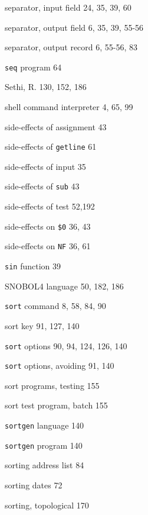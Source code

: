 \begin{multicols}{3}
\hangindent=3pc  separator, input field 24, 35, 39, 60

\hangindent=3pc  separator, output field 6, 35, 39, 55-56

\hangindent=3pc  separator, output record 6, 55-56,  83

\hangindent=3pc  \verb'seq' program 64

\hangindent=3pc  Sethi, R. 130, 152, 186

\hangindent=3pc  shell command interpreter 4, 65, 99

\hangindent=3pc  side-effects of assignment 43

\hangindent=3pc  side-effects of \verb'getline' 61

\hangindent=3pc  side-effects of input 35

\hangindent=3pc  side-effects of \verb'sub' 43

\hangindent=3pc  side-effects of test 52,192

\hangindent=3pc  side-effects on \verb'$0' 36, 43

\hangindent=3pc  side-effects on \verb'NF' 36, 61

\hangindent=3pc  \verb'sin' function 39

\hangindent=3pc  SNOBOL4 language 50, 182, 186

\hangindent=3pc  \verb'sort' command 8, 58, 84, 90

\hangindent=3pc  sort key 91, 127, 140

\hangindent=3pc  \verb'sort' options 90, 94, 124, 126, 140

\hangindent=3pc  \verb'sort' options, avoiding 91, 140


\hangindent=3pc  sort programs, testing 155

\hangindent=3pc  sort test program, batch 155

\hangindent=3pc  \verb'sortgen' language 140

\hangindent=3pc  \verb'sortgen' program 140

\hangindent=3pc  sorting address list 84

\hangindent=3pc  sorting dates 72

\hangindent=3pc  sorting, topological 170


\end{multicols}
